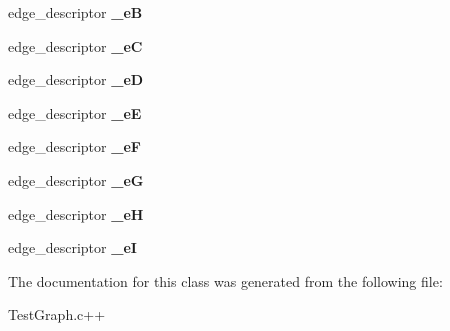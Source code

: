 \begin{DoxyCompactItemize}
\item 
\hypertarget{classCycleTests_a35ccf76b662a1ac0d4e2978a8a2f370a}{edge\-\_\-descriptor {\bfseries \-\_\-e\-B}}\label{classCycleTests_a35ccf76b662a1ac0d4e2978a8a2f370a}

\item 
\hypertarget{classCycleTests_a9b7095222c38a459d439901a727817cd}{edge\-\_\-descriptor {\bfseries \-\_\-e\-C}}\label{classCycleTests_a9b7095222c38a459d439901a727817cd}

\item 
\hypertarget{classCycleTests_affbb21a136aa305c4180d08007ad5045}{edge\-\_\-descriptor {\bfseries \-\_\-e\-D}}\label{classCycleTests_affbb21a136aa305c4180d08007ad5045}

\item 
\hypertarget{classCycleTests_a126f3ee17ed5a1d85e1d0bac8391aeb0}{edge\-\_\-descriptor {\bfseries \-\_\-e\-E}}\label{classCycleTests_a126f3ee17ed5a1d85e1d0bac8391aeb0}

\item 
\hypertarget{classCycleTests_a8e4225b073f9abbd700ed8c9831aec1e}{edge\-\_\-descriptor {\bfseries \-\_\-e\-F}}\label{classCycleTests_a8e4225b073f9abbd700ed8c9831aec1e}

\item 
\hypertarget{classCycleTests_a1a66501498788fb8f9915434a8dd008b}{edge\-\_\-descriptor {\bfseries \-\_\-e\-G}}\label{classCycleTests_a1a66501498788fb8f9915434a8dd008b}

\item 
\hypertarget{classCycleTests_a5052f96e29cd38e23f189d61dc2eaf0d}{edge\-\_\-descriptor {\bfseries \-\_\-e\-H}}\label{classCycleTests_a5052f96e29cd38e23f189d61dc2eaf0d}

\item 
\hypertarget{classCycleTests_a4b67e1dad854681913a86897e887ab27}{edge\-\_\-descriptor {\bfseries \-\_\-e\-I}}\label{classCycleTests_a4b67e1dad854681913a86897e887ab27}

\end{DoxyCompactItemize}


\-The documentation for this class was generated from the following file\-:\begin{DoxyCompactItemize}
\item 
\-Test\-Graph.\-c++\end{DoxyCompactItemize}

